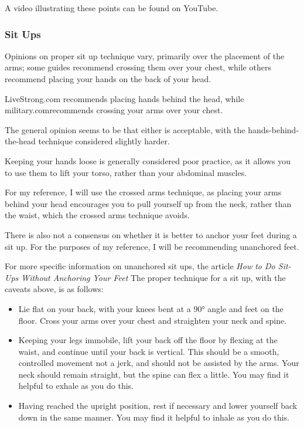 \documentclass[a4paper]{article}
\begin{document}
A video illustrating these points can be found on YouTube.\cite{bgref18}

\subsubsection{Sit Ups}

Opinions on proper sit up technique vary, primarily over the placement of the arms; some guides recommend crossing them over your chest, while others recommend placing your hands on the back of your head. 

LiveStrong.com\cite{bgref19} recommends placing hands behind the head, while military.com\cite{bgref20}recommends crossing your arms over your chest. 

The general opinion seems to be that either is acceptable, with the hands-behind-the-head technique considered slightly harder\cite{bgref21}.

Keeping your hands loose is generally considered poor practice, as it allows you to use them to lift your torso, rather than your abdominal muscles. 

For my reference, I will use the crossed arms technique, as placing your arms behind your head encourages you to pull yourself up from the neck, rather than the waist, which the crossed arms technique avoids.

There is also not a consensus on whether it is better to anchor your feet during a sit up. For the purposes of my reference, I will be recommending unanchored feet. 

For more specific information on unanchored sit ups, the article \textit{How to Do Sit-Ups Without Anchoring Your Feet}\cite{bgref22}
The proper technique for a sit up, with the caveats above, is as follows:

\begin{itemize}
    \item Lie flat on your back, with your knees bent at a 90° angle and feet on the floor. Cross your arms over your chest and straighten your neck and spine.
    \item Keeping your legs immobile, lift your back off the floor by flexing at the waist, and continue until your back is vertical. This should be a smooth, controlled movement not a jerk, and should not be assisted by the arms. Your neck should remain straight, but the spine can flex a little. You may find it helpful to exhale as you do this.
    \item Having reached the upright position, rest if necessary and lower yourself back down in the same manner. You may find it helpful to inhale as you do this.
\end{itemize}
\end{document}
